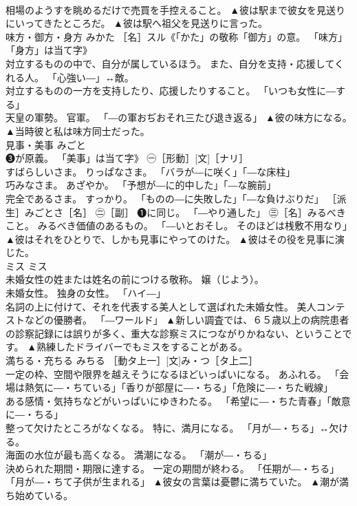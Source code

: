 \documentclass[8pt]{extreport}
\begin{document}
\begin{CJK}{UTF8}{min}
\\	相場のようすを眺めるだけで売買を手控えること。	▲彼は駅まで彼女を見送りにいってきたところだ。 ▲彼は駅へ祖父を見送りに言った。
\\	味方・御方・身方	みかた	［名］スル《「かた」の敬称「御方」の意。 「味方」「身方」は当て字》 
\\	対立するものの中で、自分が属しているほう。 また、自分を支持・応援してくれる人。 「心強い―」↔敵。 
\\	対立するものの一方を支持したり、応援したりすること。 「いつも女性に―する」 
\\	天皇の軍勢。 官軍。 「―の軍おぢおそれ三たび退き返る」	▲彼の味方になる。 ▲当時彼と私は味方同士だった。
\\	見事・美事	みごと	
\\	❸が原義。 「美事」は当て字》 ㊀［形動］[文]［ナリ］ 
\\	すばらしいさま。 りっぱなさま。 「バラが―に咲く」「―な床柱」 
\\	巧みなさま。 あざやか。 「予想が―に的中した」「―な腕前」 
\\	完全であるさま。 すっかり。 「ものの―に失敗した」「―な負けぶりだ」 ［派生］みごとさ［名］ ㊁［副］ ❶に同じ。 「―やり通した」 ㊂［名］みるべきこと。 みるべき価値のあるもの。 「―いとおそし。 そのほどは桟敷不用なり」	▲彼はそれをひとりで、しかも見事にやってのけた。 ▲彼はその役を見事に演じた。
\\	ミス	ミス	
\\	未婚女性の姓または姓名の前につける敬称。 嬢（じよう）。 
\\	未婚女性。 独身の女性。 「ハイ―」 
\\	名詞の上に付けて、それを代表する美人として選ばれた未婚女性。 美人コンテストなどの優勝者。 「―ワールド」	▲新しい調査では、６５歳以上の病院患者の診察記録には誤りが多く、重大な診察ミスにつながりかねない、ということです。 ▲熟練したドライバーでもミスをすることがある。
\\	満ちる・充ちる	みちる	［動タ上一］[文]み・つ［タ上二］ 
\\	一定の枠、空間や限界を越えそうになるほどいっぱいになる。 あふれる。 「会場は熱気に―・ちている」「香りが部屋に―・ちる」「危険に―・ちた戦線」 
\\	ある感情・気持ちなどがいっぱいにゆきわたる。 「希望に―・ちた青春」「敵意に―・ちる」 
\\	整って欠けたところがなくなる。 特に、満月になる。 「月が―・ちる」↔欠ける。 
\\	海面の水位が最も高くなる。 満潮になる。 「潮が―・ちる」 
\\	決められた期間・期限に達する。 一定の期間が終わる。 「任期が―・ちる」「月が―・ちて子供が生まれる」	▲彼女の言葉は憂鬱に満ちていた。 ▲潮が満ち始めている。

\end{CJK}
\end{document}
